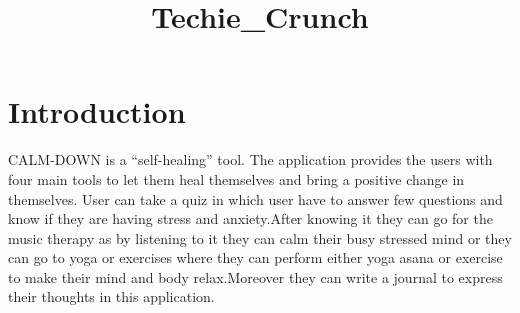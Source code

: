 \documentclass{article}
\title{Techie_Crunch}
\begin{document}
\newpage

\section  * {Introduction}
CALM-DOWN is a “self-healing” tool. The application provides the users with four main tools to let them heal themselves and bring a positive change in themselves.
User can take a quiz in which user have to answer few questions and know if they are having stress and anxiety.After knowing it they can go for the music therapy as by listening to it they can calm their busy stressed mind or they can go to yoga or exercises where they can perform  either yoga asana or exercise to make their mind and body relax.Moreover they can write a journal to express their thoughts in this application.










\end{document}
